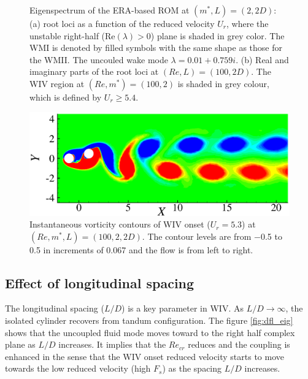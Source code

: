 \begin{figure}
\begin{subfigure}{0.495\textwidth}
    \caption{}
    \label{•}
    \end{subfigure} 
  \caption{Eigenspectrum of the ERA-based ROM at $(m^*,L)=(2,2D)$: 
     (a) root loci as a function of the reduced velocity $U_r$, 
     where the unstable right-half (Re$(\lambda) > 0$) plane is shaded in grey color.
     The WMI is denoted by filled symbols with the same shape as those for the WMII. 
     The uncouled wake mode $\lambda=0.01+0.759i$.
     (b) Real and imaginary parts of the root loci at $(Re,L)=(100,2D)$.
     The WIV region at $(Re,m^*)=(100,2)$ is shaded in grey colour, which is defined by 
     $ U_{r} \ge 5.4$.}
\label{fig:ld2_eig_re100}  
\end{figure}

\begin{figure}
	 \centering
	 \includegraphics[scale=0.45]{circle_re100_m2_onset_vor}
     \caption{Instantaneous vorticity contours of WIV onset ($U_r=5.3$)
      at $(Re,m^*,L)=(100,2,2D)$.
      The contour levels are from −0.5 to 0.5 in increments of 0.067 and the flow is from left to
      right. }
\label{fig:fom_20_onset_vor}
\end{figure}


\subsection{Effect of longitudinal spacing}
The longitudinal spacing ($L/D$) is a key parameter in WIV. As $L/D \to \infty$, the isolated cylinder recovers 
from tandum configuration. The figure \ref{fig:dfl_eig} shows that the uncoupled fluid mode moves toward to 
the right half complex plane as $L/D$ increases. It implies that the $Re_{cr}$ reduces and the coupling
is enhanced in the sense that the WIV onset reduced velocity starts to move
towards the low reduced velocity (high $F_s$) as the spacing $L/D$ increases. 

